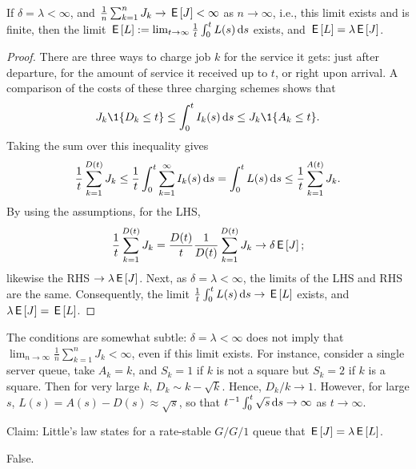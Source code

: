 \documentclass[stochastic-or.tex]{subfiles}
\begin{document}
\begin{theorem}[Little's Law, $\E L = \lambda \E J$]
If $\delta = \lambda < \infty$, and $\frac{1}{n}\sum_{k=1}^{n} J_{k} \to \,\mathsf{E}\left[J\right] < \infty$  as $n\to \infty$, i.e., this limit exists and is finite, then the limit $\,\mathsf{E}\left[L\right] := \lim_{t\to\infty} \frac{1}{t}\int_{0}^{t}L(s)\,\textrm{d}s$ exists, and $\E L = \lambda \E J$.
\end{theorem}
\begin{proof}
There are three ways to  charge job $k$ for the service it gets:  just after departure, for the amount of service it received up to $t$, or right upon arrival.
A comparison of the costs of these three charging schemes shows that
\begin{equation*}
J_{k} \1{D_k\leq t} \leq \int_0^t I_k(s) \d s \leq J_k \1{A_k \leq t}.
\end{equation*}
Taking the sum over this inequality gives
\begin{equation*}
\frac{1}{t} \sum_{k=1}^{D(t)} J_k \leq \frac{1}{t}\int_0^t \sum_{k=1}^{\infty} I_k(s) \,\textrm{d}s = \int_{0}^{t}L(s) \,\textrm{d}s \leq \frac{1}{t}\sum_{k=1}^{A(t)} J_{k}.
\end{equation*}
By using the assumptions, for the LHS,
\begin{equation*}
\frac{1}{t} \sum_{k=1}^{D(t)} J_k = \frac{D(t)}{t}\frac{1}{D(t)} \sum_{k=1}^{D(t)}J_k \to \delta \,\mathsf{E}\left[J\right];
\end{equation*}
likewise  the RHS $\to \lambda \,\mathsf{E}\left[J\right]$.
Next, as $\delta = \lambda< \infty$, the limits of the LHS and RHS are the same.
Consequently, the limit $\frac{1}{t}\int_{0}^t L(s) \,\textrm{d}s \to \,\mathsf{E}\left[L\right]$ exists, and $\lambda \,\mathsf{E}\left[J\right] = \,\mathsf{E}\left[L\right]$.
\end{proof}

The conditions are somewhat subtle: $\delta = \lambda < \infty$ does not imply that $\lim_{n\to\infty} \frac{1}{n}\sum_{k=1}^{n} J_{k} < \infty$, even if this limit exists.
For instance, consider a single server queue, take $A_k = k$, and $S_k = 1$ if $k$ is not a square but $S_k = 2$ if $k$ is a square.
Then for very large $k$, $D_k \sim k - \sqrt k$.
Hence, $D_k/k\to1$.
However, for large $s$, $L(s) = A(s) - D(s) \approx \sqrt s$, so that $t^{-1}\int_0^t\sqrt s \,\textrm{d}s \to \infty$ as $t\to \infty$.

\begin{truefalse}
Claim: Little's law states  for a rate-stable $G/G/1$ queue that $\,\mathsf{E}\left[J\right]=\lambda\,\mathsf{E}\left[L\right]$.
\begin{solution}
False.
\end{solution}
\end{truefalse}
\end{document}
